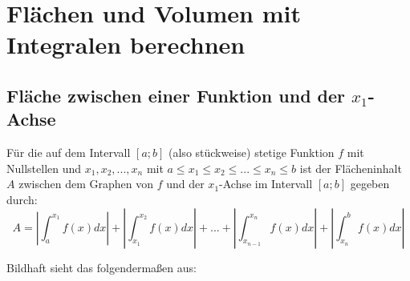 \section{Flächen und Volumen mit Integralen berechnen}
\subsection{Fläche zwischen einer Funktion und der $x_1$-Achse}
\begin{Definition}
  Für die auf dem Intervall $[a;b]$ (also stückweise) stetige Funktion $f$ mit Nullstellen und $x_1,x_2,...,x_n$
  mit $a \leq x_1 \leq x_2 \leq ... \leq x_n \leq b$ ist der Flächeninhalt $A$ zwischen dem Graphen von $f$ und
  der $x_1$-Achse im Intervall $[a;b]$ gegeben durch:
  $$A= \left|{\int_a^{x_1} f(x)dx}\right|+\left|{\int_{x_1}^{x_2} f(x)dx}\right|+...+\left|{\int_{x_{n-1}}^{x_n} f(x)dx}\right|+\left|{\int_{x_n}^b f(x)dx}\right|$$
\end{Definition}
Bildhaft sieht das folgendermaßen aus:
